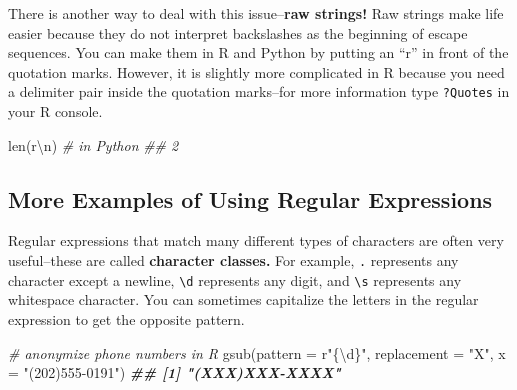 \documentclass[
  12pt,
  krantz2]{krantz}
\makeatletter
\newenvironment{Shaded}{\begin{snugshade}}{\end{snugshade}}
\newcommand{\AttributeTok}[1]{\textcolor[rgb]{0.61,0.61,0.61}{#1}}
\newcommand{\BuiltInTok}[1]{#1}
\newcommand{\CommentTok}[1]{\textcolor[rgb]{0.37,0.37,0.37}{\textit{#1}}}
\newcommand{\DocumentationTok}[1]{\textcolor[rgb]{0.37,0.37,0.37}{\textbf{\textit{#1}}}}
\newcommand{\FunctionTok}[1]{\textcolor[rgb]{0,0,0}{#1}}
\newcommand{\NormalTok}[1]{#1}
\newcommand{\StringTok}[1]{\textcolor[rgb]{0.5,0.5,0.5}{#1}}
\newcommand{\VerbatimStringTok}[1]{\textcolor[rgb]{0.5,0.5,0.5}{#1}}
\newenvironment{kframe}{%
\medskip{}
\setlength{\fboxsep}{.8em}
 \def\at@end@of@kframe{}%
 \ifinner\ifhmode%
  \def\at@end@of@kframe{\end{minipage}}%
  \begin{minipage}{\columnwidth}%
 \fi\fi%
 \def\FrameCommand##1{\hskip\@totalleftmargin \hskip-\fboxsep
 \colorbox{shadecolor}{##1}\hskip-\fboxsep
     \hskip-\linewidth \hskip-\@totalleftmargin \hskip\columnwidth}%
 \MakeFramed {\advance\hsize-\width
   \@totalleftmargin\z@ \linewidth\hsize
   \@setminipage}}%
 {\par\unskip\endMakeFramed%
 \at@end@of@kframe}
\renewenvironment{Shaded}{\begin{kframe}}{\end{kframe}}
\makeatother
\begin{document}
There is another way to deal with this issue--\textbf{raw strings!} Raw strings make life easier because they do not interpret backslashes as the beginning of escape sequences. You can make them in R and Python by putting an ``r'' in front of the quotation marks. However, it is slightly more complicated in R because you need a delimiter pair inside the quotation marks--for more information type \texttt{?Quotes} in your R console.

\begin{Shaded}
\begin{Highlighting}[]
\BuiltInTok{len}\NormalTok{(}\VerbatimStringTok{r\textquotesingle{}\textbackslash{}n\textquotesingle{}}\NormalTok{) }\CommentTok{\# in Python }
\CommentTok{\#\# 2}
\end{Highlighting}
\end{Shaded}

\begin{Shaded}
\end{Shaded}

\hypertarget{more-examples-of-using-regular-expressions}{%
\subsection{More Examples of Using Regular Expressions}\label{more-examples-of-using-regular-expressions}}

Regular expressions that match many different types of characters are often very useful--these are called \textbf{character classes.} For example, \texttt{.} represents any character except a newline, \texttt{\textbackslash{}d} represents any digit, and \texttt{\textbackslash{}s} represents any whitespace character. You can sometimes capitalize the letters in the regular expression to get the opposite pattern.

\begin{Shaded}
\begin{Highlighting}[]
\CommentTok{\# anonymize phone numbers in R}
\FunctionTok{gsub}\NormalTok{(}\AttributeTok{pattern =}\NormalTok{ r}\StringTok{"\{\textbackslash{}d\}"}\NormalTok{, }\AttributeTok{replacement =} \StringTok{"X"}\NormalTok{, }\AttributeTok{x =} \StringTok{"(202)555{-}0191"}\NormalTok{)}
\DocumentationTok{\#\# [1] "(XXX)XXX{-}XXXX"}
\end{Highlighting}
\end{Shaded}
\end{document}
